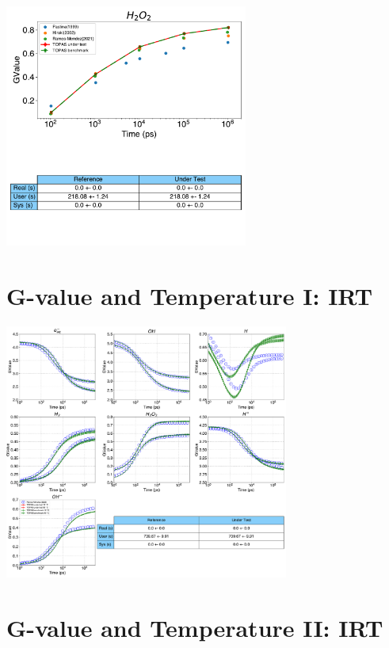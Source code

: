 \documentclass[aspectratio=1610]{beamer}
\begin{document}
\begin{frame}{\secname}
 \centering
  \includegraphics[width=0.6\textwidth]{./GvalueIRT_H2O2/TimeEvolution}
\end{frame}

\section{G-value and Temperature I: IRT}

\begin{frame}{\secname}
 \centering
  \includegraphics[width=0.7\textwidth]{./GvalueIRT-Temperature/TimeEvolution}
\end{frame}

\section{G-value and Temperature II: IRT}
\end{document}
